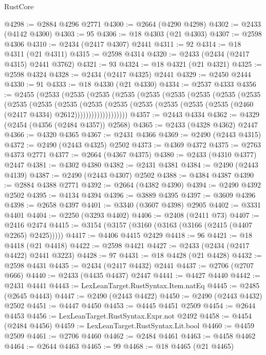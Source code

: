 \begin{lexlean}{RustCore}
\begin{coremodule}
@4298 := @2884 @4296 @2771
@4300 := @2664 (@4290 @4298)
@4302 := @2433 (@4142 @4300)
@4303 := 95
@4306 := @18 @4303 (@21 @4303)
@4307 := @2598 @4306
@4310 := @2434 (@2417 @4307) @2441
@4311 := 92
@4314 := @18 @4311 (@21 @4311)
@4315 := @2598 @4314
@4320 := @2433 (@2434 (@2417 @4315) @2441 @3762)
@4321 := 93
@4324 := @18 @4321 (@21 @4321)
@4325 := @2598 @4324
@4328 := @2434 (@2417 @4325) @2441
@4329 := @2450 @2444
@4330 := 91
@4333 := @18 @4330 (@21 @4330)
@4334 := @2537 @4333
@4356 := @2455
    (@2533
      (@2535
        (@2535
          (@2535
            (@2535
              (@2535
                (@2535
                  (@2535
                    (@2535
                      (@2535
                        (@2535
                          (@2535
                            (@2535
                              (@2535
                                (@2535
                                  (@2535 (@2535 (@2535 (@2460 (@2417 @4334) @2612)))))))))))))))))))
@4357 := @2443 @4334
@4362 := @4329 (@2454 (@4356 (@2484 @4357)) @2568)
@4365 := @2433 (@4328 @4362) @2447
@4366 := @4320 @4365
@4367 := @2431 @4366
@4369 := @2490 (@2443 @4315)
@4372 := @2490 (@2443 @4325) @2502
@4373 := @4369 @4372
@4375 := @2763 @4373 @2771
@4377 := @2664 (@4367 @4375)
@4380 := @2433 (@4310 @4377) @2447
@4381 := @4302 @4380
@4382 := @2431 @4381
@4384 := @2490 (@2443 @4139)
@4387 := @2490 (@2443 @4307) @2502
@4388 := @4384 @4387
@4390 := @2884 @4388 @2771
@4392 := @2664 (@4382 @4390)
@4394 := @2490 @4392 @2502
@4395 := @4134 @4394
@4396 := @3889 @4395
@4397 := @3609 @4396
@4398 := @2658 @4397
@4401 := @3340 (@3607 @4398) @2905
@4402 := @3331 @4401
@4404 := @2250 (@3293 @4402)
@4406 := @2408 (@2411 @73)
@4407 := @2416 @2474
@4415 := @3154 (@3157 (@3160 (@3163 (@3166 (@2415 (@4407 @2265) @2425)))))
@4417 := @4406 @4415 @2429
@4418 := 96
@4421 := @18 @4418 (@21 @4418)
@4422 := @2598 @4421
@4427 := @2433 (@2434 (@2417 @4422) @2441 @3223)
@4428 := 97
@4431 := @18 @4428 (@21 @4428)
@4432 := @2598 @4431
@4435 := @2434 (@2417 @4432) @2441
@4437 := @2706 (@2707 @666)
@4440 := @2433 (@4435 @4437) @2447
@4441 := @4427 @4440
@4442 := @2431 @4441
@4443 := LexLeanTarget.RustSyntax.Item.natEq
@4445 := @2485 (@2645 @4443)
@4447 := @2490 (@2443 @4422)
@4450 := @2490 (@2443 @4432) @2502
@4451 := @4447 @4450
@4453 := @4445 @4451 @2509
@4454 := @2644 @4453
@4456 := LexLeanTarget.RustSyntax.Expr.not @2492
@4458 := @4454 (@2484 @4456)
@4459 := LexLeanTarget.RustSyntax.Lit.bool
@4460 := @4459 @2509
@4461 := @2706 @4460
@4462 := @2484 @4461
@4463 := @4458 @4462
@4464 := @2644 @4463
@4465 := 99
@4468 := @18 @4465 (@21 @4465)

\end{coremodule}
\end{lexlean}
